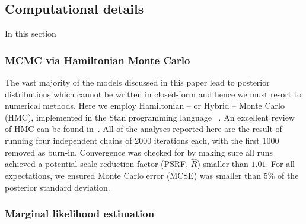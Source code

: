 \documentclass[a4paper, notitlepage, 11pt]{article}
\begin{document}
%  

\subsection{Computational details}
\label{sec:computing}

In this section 

\subsubsection*{MCMC via Hamiltonian Monte Carlo}

The vast majority of the models discussed in this paper lead to posterior distributions which cannot be written in closed-form and hence we must resort to numerical methods.
Here we employ Hamiltonian -- or Hybrid -- Monte Carlo (HMC), implemented in the Stan programming language~ \citep{Carpenter2017}.
An excellent review of HMC can be found in~\cite{Neal2011}.
All of the analyses reported here are the result of running four independent chains of 2000 iterations each, with the first 1000 removed as burn-in.
Convergence was checked for by making sure all runs achieved a potential scale reduction factor (PSRF, $\hat{R}$) smaller than $1.01$.
For all expectations, we ensured Monte Carlo error (MCSE) was smaller than 5\% of the posterior standard deviation.

\subsubsection*{Marginal likelihood estimation}
\end{document}
